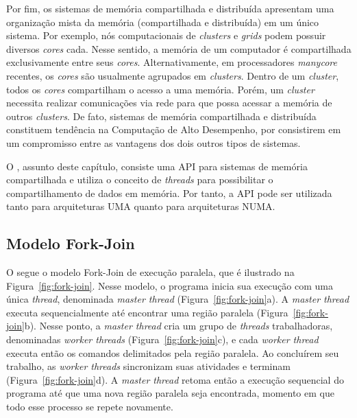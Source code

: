 \documentclass{SBCbookchapter}
\begin{document}
		Por fim, os sistemas de memória compartilhada e distribuída
		apresentam uma organização mista da memória (compartilhada e
		distribuída) em um único sistema. Por exemplo, nós
		computacionais de \textit{clusters} e \textit{grids} podem
		possuir diversos \textit{cores} cada. Nesse sentido, a memória
		de um computador é compartilhada exclusivamente entre seus
		\textit{cores}. Alternativamente, em processadores
		\textit{manycore} recentes, os \textit{cores} são usualmente
		agrupados em \textit{clusters}. Dentro de um \textit{cluster},
		todos os \textit{cores} compartilham o acesso a uma memória.
		Porém, um \textit{cluster} necessita realizar comunicações via
		rede para que possa acessar a memória de outros
		\textit{clusters}. De fato, sistemas de memória compartilhada e
		distribuída constituem tendência na Computação de Alto
		Desempenho, por consistirem em um compromisso entre as vantagens
		dos dois outros tipos de sistemas.

		O \openmp, assunto deste capítulo, consiste uma API para
		sistemas de memória compartilhada e utiliza o conceito de
		\textit{threads} para possibilitar o compartilhamento de dados
		em memória. Por tanto, a API pode ser utilizada tanto para
		arquiteturas UMA quanto para arquiteturas NUMA.
		
	\subsection{Modelo Fork-Join}

		O \openmp segue o modelo Fork-Join de execução paralela, que é
		ilustrado na Figura~\ref{fig:fork-join}. Nesse modelo, o
		programa inicia sua execução com uma única \textit{thread},
		denominada \textit{master thread} (Figura~\ref{fig:fork-join}a).
		A \textit{master thread} executa sequencialmente até encontrar
		uma região paralela (Figura~\ref{fig:fork-join}b). Nesse ponto, a
		\textit{master thread} cria um grupo de \textit{threads}
		trabalhadoras, denominadas \textit{worker threads}
		(Figura~\ref{fig:fork-join}c), e cada \textit{worker thread}
		executa então os comandos delimitados pela região paralela. Ao
		concluírem seu trabalho, as \textit{worker threads} sincronizam
		suas atividades e terminam (Figura~\ref{fig:fork-join}d). A
		\textit{master thread} retoma então a execução sequencial do
		programa até que uma nova região paralela seja encontrada,
		momento em que todo esse processo se repete novamente.
		
\end{document}
